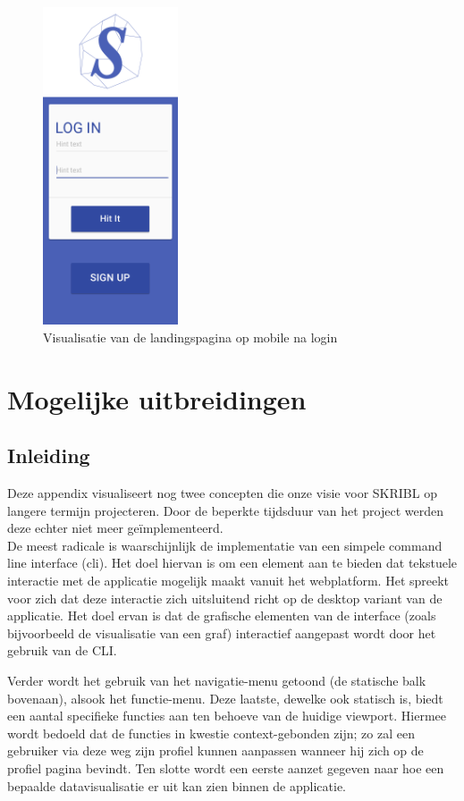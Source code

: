 \documentclass{article}
\begin{document}
\begin{appendices}
\begin{figure}[!h]
\centering
 \includegraphics[width=40mm]{pieteruploads/SKRBL_FRNT_MobilePortrait2.png}
 \caption{Visualisatie van de landingspagina op mobile na login }
\end{figure}
\clearpage



\section{Mogelijke uitbreidingen}

\subsection{Inleiding}

Deze appendix visualiseert nog twee concepten die onze visie voor SKRIBL op langere termijn projecteren. Door de beperkte tijdsduur van het project werden deze echter niet meer ge\"implementeerd. \\

De meest radicale is waarschijnlijk de implementatie van een simpele command line interface (cli). Het doel hiervan is om een element aan te bieden dat tekstuele interactie met de applicatie mogelijk maakt vanuit het webplatform. Het spreekt voor zich dat deze interactie zich uitsluitend richt op de desktop variant van de applicatie. Het doel ervan is dat de grafische elementen van de interface (zoals bijvoorbeeld de visualisatie van een graf) interactief aangepast wordt door het gebruik van de CLI. 

Verder wordt het gebruik van het navigatie-menu getoond (de statische balk bovenaan), alsook het functie-menu. Deze laatste, dewelke ook statisch is, biedt een aantal specifieke functies aan ten behoeve van de huidige viewport. Hiermee wordt bedoeld dat de functies in kwestie context-gebonden zijn; zo zal een gebruiker via deze weg zijn profiel kunnen aanpassen wanneer hij zich op de profiel pagina bevindt. Ten slotte wordt een eerste aanzet gegeven naar hoe een bepaalde datavisualisatie er uit kan zien binnen de applicatie.



\end{appendices}
\end{document}
